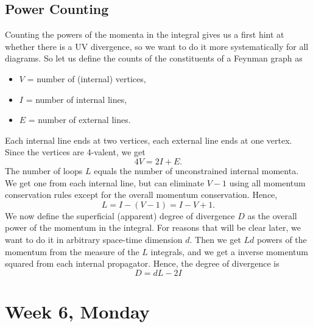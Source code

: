 \subsection{Power Counting}

Counting the powers of the momenta in the integral gives us a first
hint at whether there is a UV divergence, so we want to do it more
systematically for all diagrams. So let us define the counts of the
constituents of a Feynman graph as
\begin{itemize}
\item $V$ = number of (internal) vertices,
\item $I$ = number of internal lines,
\item $E$ = number of external lines.
\end{itemize}
Each internal line ends at two vertices, each external line ends at
one vertex. Since the vertices are 4-valent, we get
\begin{equation}
  4V = 2I + E.
\end{equation}
The number of loops $L$ equals the number of unconstrained internal
momenta. We get one from each internal line, but can eliminate $V-1$
using all momentum conservation rules except for the overall momentum
conservation. Hence,
\begin{equation}
  L = I - (V-1) = I - V + 1.
\end{equation}
We now define the superficial (apparent) degree of divergence $D$ as
the overall power of the momentum in the integral. For reasons that
will be clear later, we want to do it in arbitrary space-time
dimension $d$. Then we get $Ld$ powers of the momentum from the
measure of the $L$ integrals, and we get a inverse momentum squared
from each internal propagator. Hence, the degree of divergence is
\begin{equation}
  D = dL - 2I
\end{equation}







\section{Week 6, Monday}

